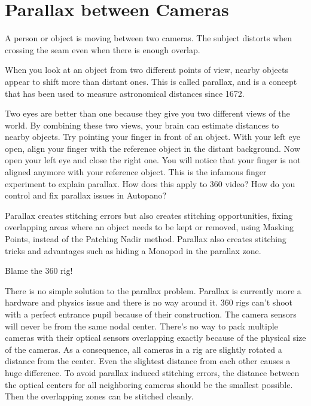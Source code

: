 \chapter{Parallax between Cameras}
\pagecolor{white}
\label{chap:37}
\begin{fullwidth}

\problem

{\large A person or object is moving between two cameras. The subject distorts when crossing the seam even when there is enough overlap. \par}

When you look at an object from two different points of view, nearby objects appear to shift more than distant ones. This is called parallax, and is a concept that has been used to measure astronomical distances since 1672.


Two eyes are better than one because they give you two different views of the world. By combining these two views, your brain can estimate distances to nearby objects. Try pointing your finger in front of an object. With your left eye open, align your finger with the reference object in the distant background. Now open your left eye and close the right one. You will notice that your finger is not aligned anymore with your reference object. This is the infamous finger experiment to explain parallax. How does this apply to 360 video? How do you control and fix parallax issues in Autopano?

\solutions

Parallax creates stitching errors but also creates stitching opportunities, fixing overlapping areas where an object needs to be kept or removed, using Masking Points, instead of the Patching Nadir method. Parallax also creates stitching tricks and advantages such as hiding a Monopod in the parallax zone.

{\large Blame the 360 rig! \par}

There is no simple solution to the parallax problem. Parallax is currently more a hardware and physics issue and there is no way around it. 360 rigs can't shoot with a perfect entrance pupil because of their construction. The camera sensors will never be from the same nodal center. There’s no way to pack multiple cameras with their optical sensors overlapping exactly because of the physical size of the cameras. As a consequence, all cameras in a rig are slightly rotated a distance from the center. Even the slightest distance from each other causes a huge difference. To avoid parallax induced stitching errors, the distance between the optical centers for all neighboring cameras should be the smallest possible. Then the overlapping zones can be stitched cleanly. 


\end{fullwidth}
